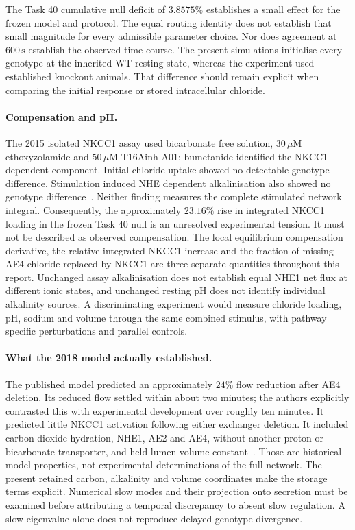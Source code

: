 The Task 40 cumulative null deficit of $3.8575\%$ establishes a small
effect for the frozen model and protocol. The equal routing identity
does not establish that small magnitude for every admissible parameter
choice. Nor does agreement at $600\,\mathrm{s}$ establish the observed
time course. The present simulations initialise every genotype at the
inherited WT resting state, whereas the experiment used established
knockout animals. That difference should remain explicit when comparing
the initial response or stored intracellular chloride.

\paragraph{Compensation and pH.}
The 2015 isolated NKCC1 assay used bicarbonate free solution,
$30\,\mu\mathrm{M}$ ethoxyzolamide and
$50\,\mu\mathrm{M}$ T16Ainh-A01; bumetanide identified the
NKCC1 dependent component. Initial chloride uptake showed no detectable
genotype difference. Stimulation induced NHE dependent alkalinisation
also showed no genotype difference~\cite{m44Pena2015}.
Neither finding measures the complete stimulated network integral.
Consequently, the approximately $23.16\%$ rise in integrated NKCC1
loading in the frozen Task 40 null is an unresolved experimental
tension. It must not be described as observed compensation. The local
equilibrium compensation derivative, the relative integrated NKCC1
increase and the fraction of missing AE4 chloride replaced by NKCC1
are three separate quantities throughout this report. Unchanged assay
alkalinisation does not establish equal NHE1 net flux at different ionic
states, and unchanged resting pH does not identify individual alkalinity
sources. A discriminating experiment would measure chloride loading,
pH, sodium and volume through the same combined stimulus, with
pathway specific perturbations and parallel controls.

\paragraph{What the 2018 model actually established.}
The published model predicted an approximately $24\%$ flow reduction
after AE4 deletion. Its reduced flow settled within about two minutes;
the authors explicitly contrasted this with experimental development
over roughly ten minutes. It predicted little NKCC1 activation following
either exchanger deletion. It included carbon dioxide hydration, NHE1,
AE2 and AE4, without another proton or bicarbonate transporter, and
held lumen volume constant~\cite{m44VeraSiguenza2018}.
Those are historical model properties, not experimental determinations
of the full network. The present retained carbon, alkalinity and volume
coordinates make the storage terms explicit. Numerical slow modes and
their projection onto secretion must be examined before attributing a
temporal discrepancy to absent slow regulation. A slow eigenvalue alone
does not reproduce delayed genotype divergence.

